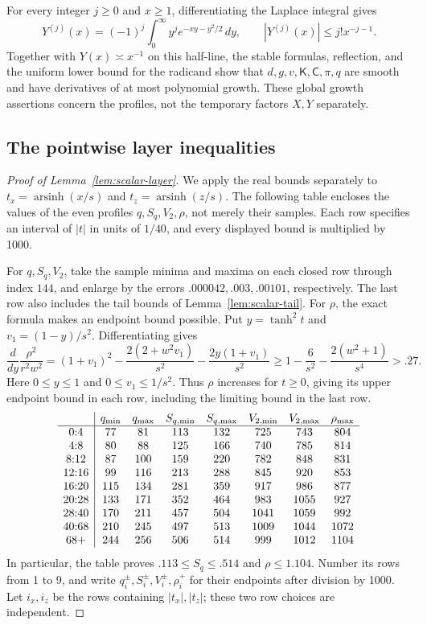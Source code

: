 For every integer \(j\ge0\) and \(x\ge1\), differentiating the
Laplace integral gives
\[
 Y^{(j)}(x)=(-1)^j\int_0^\infty y^j e^{-xy-y^2/2}\,dy,
 \qquad |Y^{(j)}(x)|\le j!x^{-j-1}.
\]
Together with \(Y(x)\asymp x^{-1}\) on this half-line, the stable
formulas, reflection, and the uniform lower bound for the radicand show
that \(d,g,v,\mathsf K,\mathsf C,\pi,q\) are smooth and have derivatives
of at most polynomial growth. These global growth assertions concern
the profiles, not the temporary factors \(X,Y\) separately.


\subsection{The pointwise layer inequalities}

\begin{proof}[Proof of Lemma~\ref{lem:scalar-layer}]
We apply the real bounds separately to
\(t_x=\operatorname{arsinh}(x/s)\) and
\(t_z=\operatorname{arsinh}(z/s)\).
The following table encloses the values of the even profiles
\(q,S_q,V_2,\rho\), not merely their samples. Each row specifies an
interval of \(|t|\) in units of \(1/40\), and every displayed bound
is multiplied by 1000.

For \(q,S_q,V_2\), take the sample minima and maxima on each closed
row through index \(144\), and enlarge by the errors
\(.000042,.003,.00101\), respectively. The last row also includes
the tail bounds of Lemma~\ref{lem:scalar-tail}.
For \(\rho\), the exact formula makes an endpoint bound possible.
Put \(y=\tanh^2t\) and \(v_1=(1-y)/s^2\). Differentiating gives
\[
 \frac{d}{dy}\frac{\rho^2}{r^2w^2}
 =(1+v_1)^2-\frac{2(2+w^2v_1)}{s^2}
             -\frac{2y(1+v_1)}{s^2}
 \ge1-\frac6{s^2}-\frac{2(w^2+1)}{s^4}>.27.
\]
Here \(0\le y\le1\) and \(0\le v_1\le1/s^2\).
Thus \(\rho\) increases for \(t\ge0\), giving its upper endpoint
bound in each row, including the limiting bound in the last row.
\[
\begin{array}{c|cc cc cc c}
 & q_{\min}&q_{\max}& S_{q,\min}& S_{q,\max}& V_{2,\min}& V_{2,\max}& \rho_{\max}\\\hline
 0{:}4&77&81&113&132&725&743&804\\
 4{:}8&80&88&125&166&740&785&814\\
 8{:}12&87&100&159&220&782&848&831\\
 12{:}16&99&116&213&288&845&920&853\\
 16{:}20&115&134&281&359&917&986&877\\
 20{:}28&133&171&352&464&983&1055&927\\
 28{:}40&170&211&457&504&1041&1059&992\\
 40{:}68&210&245&497&513&1009&1044&1072\\
 68{+}&244&256&506&514&999&1012&1104
\end{array}
\]
In particular, the table proves \(.113\le S_q\le.514\) and
\(\rho\le1.104\). Number its rows from 1 to 9, and write
\(q_i^\pm,S_i^\pm,V_i^\pm,\rho_i^+\) for their endpoints after
division by 1000. Let \(i_x,i_z\) be the rows containing
\(|t_x|,|t_z|\); these two row choices are independent.


\end{proof}
